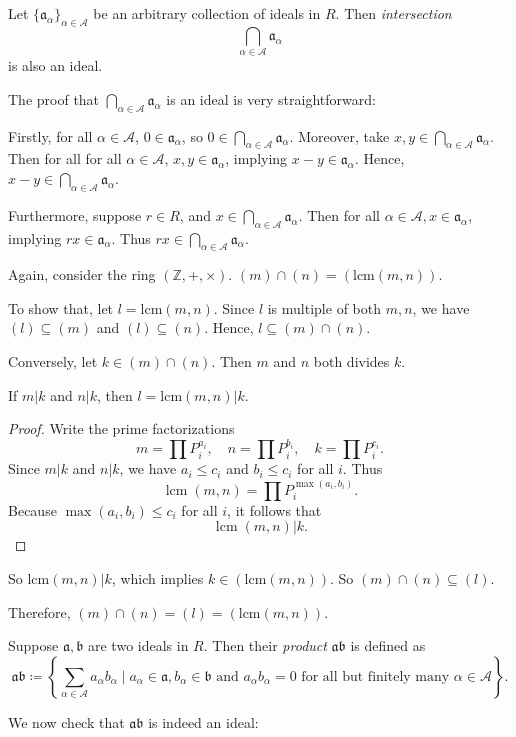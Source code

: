 \begin{definition}[Interseciton]
    Let \(\{\mathfrak{a}_\alpha\}_{\alpha \in \mathcal{A}}\) be an arbitrary collection of ideals in \(R\). Then \emph{intersection} \[\bigcap_{\alpha \in \mathcal{A}}\mathfrak{a}_\alpha\] is also an ideal.
\end{definition}
The proof that \(\bigcap_{\alpha \in \mathcal{A}}\mathfrak{a}_\alpha\) is an ideal is very straightforward:

Firstly, for all \(\alpha \in \mathcal{A}\), \(0 \in \mathfrak{a}_\alpha\), so \(0 \in \bigcap_{\alpha \in \mathcal{A}}\mathfrak{a}_\alpha\). Moreover, take \(x, y \in \bigcap_{\alpha \in \mathcal{A}}\mathfrak{a}_\alpha\). Then for all for all \(\alpha \in \mathcal{A}\), \(x, y \in \mathfrak{a}_\alpha\), implying \(x-y \in \mathfrak{a}_\alpha\). Hence, \(x-y \in \bigcap_{\alpha \in \mathcal{A}} \mathfrak{a}_{\alpha}\).

Furthermore, suppose \(r \in R\), and \(x \in \bigcap_{\alpha \in \mathcal{A}} \mathfrak{a}_{\alpha}\). Then for all \(\alpha \in \mathcal{A}, x \in \mathfrak{a}_\alpha\), implying \(rx \in \mathfrak{a}_\alpha\). Thus \(rx \in \bigcap_{\alpha \in \mathcal{A}} \mathfrak{a}_{\alpha}\).

\begin{example}\label{mcapnequalslcm}
    Again, consider the ring \((\mathbb{Z}, +, \times)\). \((m) \cap (n) = (\text{lcm}(m, n))\).

    To show that, let \(l = \text{lcm}(m, n)\). Since \(l\) is multiple of both \(m, n\), we have \((l) \subseteq (m)\) and \((l) \subseteq (n)\). Hence, \(l \subseteq (m) \cap (n)\).

    Conversely, let \(k \in (m) \cap (n)\). Then \(m\) and \(n\) both divides \(k\).
    \begin{claim}
        If \(m | k\) and \(n | k\), then \(l = \text{lcm}(m,n) | k\). 
    \end{claim}
    \begin{proof}
        Write the prime factorizations
\[
m=\prod P_i^{a_i}, 
\quad 
n=\prod P_i^{b_i}, 
\quad 
k=\prod P_i^{c_i}.
\]
Since $m |k$ and $n | k$, we have $a_i \le c_i$ and $b_i \le c_i$ for all $i$.
Thus
\[
\operatorname{lcm}(m,n)=\prod P_i^{\max(a_i,b_i)}.
\]
Because $\max(a_i,b_i)\le c_i$ for all $i$, it follows that
\[
\operatorname{lcm}(m,n)| k.
\]
    \end{proof}
    So \(\text{lcm}(m,n) | k\), which implies \(k \in (\text{lcm}(m,n))\). So \((m)\cap (n) \subseteq (l)\).

    Therefore, \((m) \cap (n) = (l) = (\text{lcm}(m,n))\).
\end{example}
\begin{definition}
    Suppose \(\mathfrak{a}, \mathfrak{b}\) are two ideals in \(R\). Then their \emph{product} \(\mathfrak{a}\mathfrak{b}\) is defined as \[\mathfrak{a}\mathfrak{b} \coloneq \left\{\sum_{\alpha \in \mathcal{A}} a_\alpha b_\alpha \mid a_\alpha \in \mathfrak{a}, b_\alpha \in \mathfrak{b} \text{ and } a_\alpha b_\alpha = 0 \text{ for all but finitely many } \alpha \in \mathcal{A} \right\}.\]
\end{definition}
We now check that \(\mathfrak{a}\mathfrak{b}\) is indeed an ideal: 

